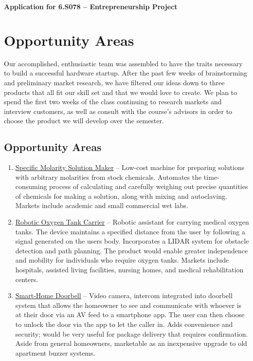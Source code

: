 \documentclass[8pt]{article}
\begin{document}
\begin{center}
\LARGE{\textbf{Application for 6.S078 -- Entrepreneurship Project}}
\end{center}

\vspace{.3cm}

\section*{Opportunity Areas}
Our accomplished, enthusiastic team was assembled to have the traits necessary
to build a successful hardware startup. After the past few weeks of
brainstorming and preliminary market research, we have filtered our ideas down
to three products that all fit our skill set and that we would love to create.
We plan to spend the first two weeks of the class continuing to research markets
and interview customers, as well as consult with the course's advisors in order
to choose the product we will develop over the semester.

\subsection*{Opportunity Areas}
\begin{enumerate}
\item \underline{Specific Molarity Solution Maker} -- Low-cost machine for preparing solutions with arbitrary molarities from stock chemicals. Automates the time-consuming process of calculating and carefully weighing out precise quantities of chemicals for making a solution, along with mixing and autoclaving. Markets include academic and small commercial wet labs.
\item \underline{Robotic Oxygen Tank Carrier} -- Robotic assistant for carrying medical oxygen tanks. The device maintains a specified distance from the user by following a signal generated on the users body. Incorporates a LIDAR system for obstacle detection and path planning. The product would enable greater independence and mobility for individuals who require oxygen tanks. Markets include hospitals, assisted living facilities, nursing homes, and medical rehabilitation centers.
\item \underline{Smart-Home Doorbell} -- Video camera, intercom integrated into doorbell system that allows the homeowner to see and communicate with whoever is at their door via an AV feed to a smartphone app. The user can then choose to unlock the door via the app to let the caller in. Adds convenience and security; would be very useful for package delivery that requires confirmation. Aside from general homeowners, marketable as an inexpensive upgrade to old apartment buzzer systems.
\end{enumerate}
\end{document}

